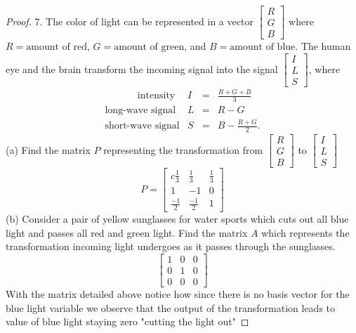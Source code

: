 \documentclass[12pt]{article}
\begin{document}
\begin{proof}
  7. The color of light can be represented in a vector $\begin{bmatrix} R \\ G \\ B \end{bmatrix}$ where $R = \text{amount of red}$,
  $G = \text{amount of green}$, and $B = \text{amount of blue}$. The human eye and the brain transform the incoming signal into the
  signal $\begin{bmatrix} I \\ L \\ S\end{bmatrix}$, where
  \[
  \begin{matrix}
  \text{~~~~~~~~~~intensity} & I & = & \frac{R+G+B}{3}\\
  \text{long-wave signal} & L & = & R - G \\
  \text{short-wave signal} & S & =& B - \frac{R+G}{2}.
  \end{matrix}
  \]
  \vskip 10pt
  \noindent
  (a) Find the matrix $P$ representing the transformation from  $\begin{bmatrix} R \\ G \\ B \end{bmatrix}$ to
  $\begin{bmatrix} I \\ L \\ S\end{bmatrix}$
  \vskip 5pt
  \[
  \renewcommand{\arraystretch}{2.5}
    P=\begin{bmatrix}c
      \frac{1}{3}&  \frac{1}{3}&  \frac{1}{3}\\
      1&-1&0\\
      \frac{-1}{2}&\frac{-1}{2}&1
  \end{bmatrix}
  \]
  \noindent
  (b) Consider a pair of yellow sunglasses for water sports which cuts out all blue light and passes all red and green light. Find the
  matrix $A$ which represents the transformation incoming light undergoes as it passes through the sunglasses.
  \[
  \begin{bmatrix}
    1&0&0\\0&1&0\\0&0&0
  \end{bmatrix}
  \]
  With the matrix detailed above notice how since there is no basis vector for the blue light variable we observe that the output of the transformation leads to value of blue light staying zero "cutting the light out"

\end{proof}
\end{document}
